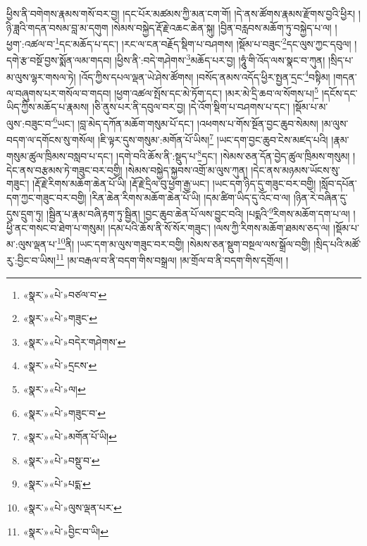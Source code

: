 ཕྱིས་ནི་བགེགས་རྣམས་གསོ་བར་བྱ། །དང་པོར་མཚམས་ཀྱི་མན་ངག་གོ། །དེ་ནས་ཚོགས་རྣམས་རྫོགས་བྱའི་ཕྱིར། །ཉི་ཟླའི་གདན་བསམ་བླ་མ་དགུག །སེམས་བསྐྱེད་རྡོ་རྗེ་འཆང་ཆེན་སྐུ། །བྱིན་བརླབས་མཆོག་ཏུ་བསྐྱེད་པ་ལ། །ཕྱག་:འཚལ་བ་\footnote{«སྣར་»«པེ་»བཙལ་བ་}དང་མཆོད་པ་དང་། །རང་ལ་ངན་བརྗོད་སྡིག་པ་བཤགས། །སྡོམ་པ་བཟུང་\footnote{«སྣར་»«པེ་»གཟུང་}དང་ལུས་ཀྱང་དབུལ། །དགེ་རྩ་བསྔོ་བྱས་སྨོན་ལམ་གདབ། །ཕྱིས་ནི་:བདེ་གཤེགས་\footnote{«སྣར་»«པེ་»བདེར་གཤེགས་}མཆོད་པར་བྱ། །ཧཱུཾ་གི་འོད་ལས་སྣང་བ་ཀུན། །སྲིད་པ་མ་ལུས་ལྷར་གསལ་ཏེ། །འོད་ཀྱིས་དཔལ་ལྡན་ཡེ་ཤེས་ཚོགས། །བསོད་ནམས་འདོད་ཕྱིར་སྤྱན་དྲང་\footnote{«སྣར་»«པེ་»དྲངས་}བསྟིམ། །གདན་ལ་བཞུགས་པར་གསོལ་བ་གདབ། །ཕྱག་འཚལ་སྤོས་དང་མེ་ཏོག་དང་། །མར་མེ་དྲི་ཆབ་ལ་སོགས་པ།\footnote{«སྣར་»«པེ་»ལ།} །དངོས་དང་ཡིད་ཀྱིས་མཆོད་པ་རྣམས། །ཅི་ནུས་པར་ནི་དབུལ་བར་བྱ། །དེ་འོག་སྡིག་པ་བཤགས་པ་དང་། །སྡོམ་པ་མ་ལུས་:བཟུང་བ་\footnote{«སྣར་»«པེ་»གཟུང་བ་}ཡང་། །བླ་མེད་དཀོན་མཆོག་གསུམ་པོ་དང་། །འཕགས་པ་གོས་སྔོན་བྱང་ཆུབ་སེམས། །མ་ལུས་བདག་ལ་དགོངས་སུ་གསོལ། །ཇི་ལྟར་དུས་གསུམ་:མགོན་པོ་ཡིས།\footnote{«སྣར་»«པེ་»མགོན་པོ་ཡི།} །ཡང་དག་བྱང་ཆུབ་ངེས་མཛད་པའི། །རྣམ་གསུམ་ཚུལ་ཁྲིམས་བསླབ་པ་དང་། །དགེ་བའི་ཆོས་ནི་:སྡུད་པ་\footnote{«སྣར་»«པེ་»བསྡུ་བ་}དང་། །སེམས་ཅན་དོན་བྱེད་ཚུལ་ཁྲིམས་གསུམ། །དེང་ནས་བརྩམས་ཏེ་གཟུང་བར་བགྱི། །སེམས་བསྐྱེད་སྐྱབས་འགྲོ་མ་ལུས་ཀུན། །དེང་ནས་མཉམས་ཡོངས་སུ་གཟུང་། །རྡོ་རྗེ་རིགས་མཆོག་ཆེན་པོ་ཡི། །རྡོ་རྗེ་དྲིལ་བུ་ཕྱག་རྒྱ་ཡང་། །ཡང་དག་ཉིད་དུ་གཟུང་བར་བགྱི། །སློབ་དཔོན་དག་ཀྱང་གཟུང་བར་བགྱི། །རིན་ཆེན་རིགས་མཆོག་ཆེན་པོ་ཡི། །དམ་ཚིག་ཡིད་དུ་འོང་བ་ལ། །ཉིན་རེ་བཞིན་དུ་དུས་དྲུག་ཏུ། །སྦྱིན་པ་རྣམ་བཞི་རྟག་ཏུ་སྦྱིན། །བྱང་ཆུབ་ཆེན་པོ་ལས་བྱུང་བའི། །པདྨའི་\footnote{«སྣར་»«པེ་»པདྨ་}རིགས་མཆོག་དག་པ་ལ། །ཕྱི་ནང་གསང་བ་ཐེག་པ་གསུམ། །དམ་པའི་ཆོས་ནི་སོ་སོར་གཟུང་། །ལས་ཀྱི་རིགས་མཆོག་ཐམས་ཅད་ལ། །སྡོམ་པ་མ་:ལུས་ལྡན་པ་\footnote{«སྣར་»«པེ་»ལུས་ལྡན་པར་}ནི། །ཡང་དག་མ་ལུས་གཟུང་བར་བགྱི། །སེམས་ཅན་སྡུག་བསྔལ་ལས་སྒྲོལ་བགྱི། །སྲིད་པའི་མཚོ་རུ་:བྱིང་བ་ཡིས།\footnote{«སྣར་»«པེ་»བྱིང་བ་ཡི།} །མ་བརྒལ་བ་ནི་བདག་གིས་བསྒྲལ། །མ་གྲོལ་བ་ནི་བདག་གིས་དགྲོལ། །
